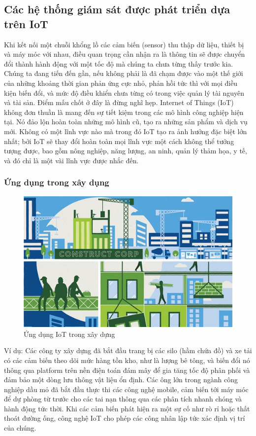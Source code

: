 \subsection{Các hệ thống giám sát được phát triển dựa trên IoT}
Khi kết nối một chuỗi khổng lồ các cảm biến (sensor) thu thập dữ liệu, thiết bị và máy móc với nhau, điều quan trọng cần nhận ra là thông tin sẽ được chuyển đổi thành hành động với một tốc độ mà chúng ta chưa từng thấy trước kia. Chúng ta đang tiến đến gần, nếu không phải là đã chạm được vào một thế giới của những khoảng thời gian phản ứng cực nhỏ, phản hồi tức thì với mọi điều kiện biến đổi, và mức độ điều khiển chưa từng có trong việc quản lý tài nguyên và tài sản.
Điểm mấu chốt ở đây là đừng nghĩ hẹp. Internet of Things (IoT) không đơn thuần là mang đến sự tiết kiệm trong các mô hình công nghiệp hiện tại. Nó đảo lộn hoàn toàn những mô hình cũ, tạo ra những sản phẩm và dịch vụ mới. Không có một lĩnh vực nào mà trong đó IoT tạo ra ảnh hưởng đặc biệt lớn nhất; bởi IoT sẽ thay đổi hoàn toàn mọi lĩnh vực một cách không thể tưởng tượng được, bao gồm nông nghiệp, năng lượng, an ninh, quản lý thảm họa, y tế, và đó chỉ là một vài lĩnh vực được nhắc đến.

\subsubsection*{Ứng dụng trong xây dụng }
\begin{figure}[H] 
\centering    
\includegraphics[width=1\textwidth]{pic8}
\caption[Ứng dụng IoT trong xây dựng ]{Ứng dụng IoT trong xây dựng }
\label{fig:pic8}
\end{figure}

Ví dụ: Các công ty xây dựng đã bắt đầu trang bị các silo (hầm chứa đồ) và xe tải có các cảm biến theo dõi mức hàng tồn kho, như là lượng bê tông, và biến đổi nó thông qua platform trên nền điện toán đám mây để gia tăng tốc độ phân phối và đảm bảo một dòng lưu thông vật liệu ổn định. Các ông lớn trong ngành công nghiệp dầu mỏ đã bắt đầu thực thi các công nghệ mobile, cảm biến tới máy móc để dự phòng từ trước cho các tai nạn thông qua các phân tích nhanh chóng và hành động tức thời. Khi các cảm biến phát hiện ra một sự cố như rò rỉ hoặc thất thoát đường ống, công nghệ IoT cho phép các công nhân lập tức xác định vị trí của chúng.


